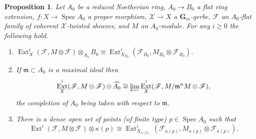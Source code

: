 \documentclass[11pt]{amsart}
\newcommand{\field}[1]{\mathbf #1}
\newcommand{\mf}[1]{\mathfrak #1}
\newcommand{\ms}[1]{\mathscr #1}
\newcommand{\spec}{\operatorname{Spec}}
\newcommand{\G}{\field G} %
\DeclareMathOperator{\ext}{\operatorname{Ext}}
\renewcommand{\[}{[\!\hspace{0.03em}[}
\renewcommand{\]}{]\!\hspace{0.03em}]}
\renewcommand{\(}{(\!\hspace{0.03em}(}
\renewcommand{\)}{)\!\hspace{0.03em})}
\DeclareMathOperator*{\tensor}{\otimes}
\newcommand{\invlim}{\varprojlim}
\newtheorem{prop}[lem]{Proposition}
\theoremstyle{definition}
\theoremstyle{remark}
\begin{document}
\begin{prop}\label{P:loc and constr} Let 
$A_{0}$ be a reduced Noetherian ring, $A_{0}\to B_{0}$ a flat ring 
extension, $f:X\to\spec A_{0}$ a proper 
morphism, $\ms X\to X$ a $\G_{m}$-gerbe, $\ms F$ an $A_{0}$-flat 
family of coherent $\ms X$-twisted sheaves, and $M$ an 
$A_{0}$-module.  For any $i\geq 0$ the following hold.
    \begin{enumerate}
	\item $\ext^{i}_{X}(\ms F,M\tensor\ms 
	F)\tensor_{A_{0}}B_{0}\cong\ext^{i}_{X_{B_{0}}}(\ms 
	F_{B_{0}},M_{B_{0}}\tensor\ms F_{B_{0}})$.
    
	\item If $\mf m\subset A_{0}$ is a maximal ideal then 
	$$\ext^{i}_{X}(\ms F,M\tensor\ms 
	F)\tensor\widehat{A_{0}}\cong\invlim\ext^{i}_{X}(\ms F,M/\mf 
	m^{n}M\tensor\ms F),$$ the completion of $A_0$ being taken with respect 
	to $\mf m$.
    
	\item There is a dense open set of points (of finite type) 
	$p\in\spec A_{0}$ such that $$\ext^{i}(\ms F,M\tensor\ms 
	F)\tensor\kappa(p)\cong\ext^{i}_{X_{\kappa(p)}}(\ms 
	F_{\kappa(p)},M_{\kappa(p)}\tensor\ms F_{\kappa(p)}).$$
    \end{enumerate}
\end{prop}
\end{document}
